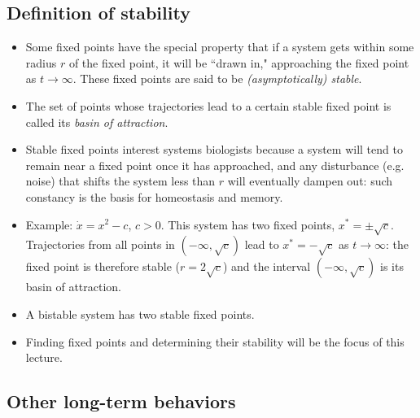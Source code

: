 \documentclass{article}
\begin{document}
\subsection*{Definition of stability}

\begin{itemize}

\item Some fixed points have the special property that if a system gets within some radius $r$ of the fixed point, it will be ``drawn in," approaching the fixed point as $t \to \infty$. These fixed points are said to be \textit{(asymptotically) stable}.

\item The set of points whose trajectories lead to a certain stable fixed point is called its \textit{basin of attraction}.

\item Stable fixed points interest systems biologists because a system will tend to remain near a fixed point once it has approached, and any disturbance (e.g. noise) that shifts the system less than $r$ will eventually dampen out: such constancy is the basis for homeostasis and memory.

\item Example: $\dot{x} = x^2 - c$, $c>0$. This system has two fixed points, $x^*=\pm \sqrt{c}$. Trajectories from all points in $(-\infty, \sqrt{c})$ lead to $x^*=-\sqrt{c}$ as $t \to \infty$: the fixed point is therefore stable ($r=2\sqrt{c}$) and the interval $(-\infty, \sqrt{c})$ is its basin of attraction.

\item A bistable system has two stable fixed points.

\item Finding fixed points and determining their stability will be the focus of this lecture.

\end{itemize}

\subsection*{Other long-term behaviors}
\end{document}
